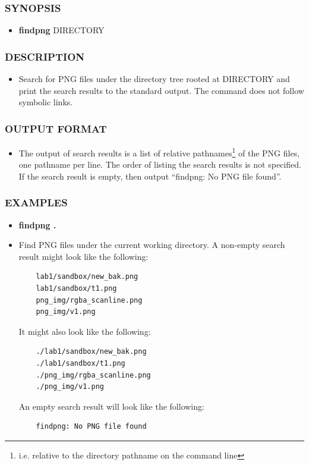 \subsubsection*{SYNOPSIS}
\begin{itemize}
	\item[]{\bf findpng} DIRECTORY 
\end{itemize}
\subsubsection*{DESCRIPTION}
\begin{itemize}
	\item[]Search for PNG files under the directory tree rooted at DIRECTORY and print the search results to the standard output. The command does not follow symbolic links.
\end{itemize}
\subsubsection*{OUTPUT FORMAT}
\begin{itemize}
	\item[]The output of search results is a list of relative pathnames\footnote{i.e. relative to the directory pathname on the command line} of the PNG files, one pathname per line. The order of listing the search results is not specified. If the search result is empty, then output ``findpng: No PNG file found''.
\end{itemize}
\subsubsection*{EXAMPLES}
\begin{itemize}
	\item[]{\bf findpng .}
	\item[]Find PNG files under the current working directory. A non-empty search result might look like the following:
	\begin{verbatim}
	lab1/sandbox/new_bak.png
	lab1/sandbox/t1.png
	png_img/rgba_scanline.png
	png_img/v1.png
	\end{verbatim}
    It might also look like the following:
	\begin{verbatim}
	./lab1/sandbox/new_bak.png
	./lab1/sandbox/t1.png
	./png_img/rgba_scanline.png
	./png_img/v1.png
	\end{verbatim}
	An empty search result will look like the following:
	\begin{verbatim}
	findpng: No PNG file found
	\end{verbatim}
\end{itemize}
